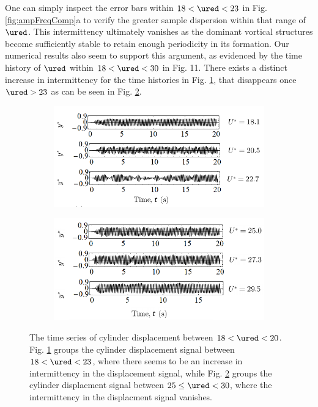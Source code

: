 \documentclass[a4paper,fleqn]{cas-sc}
\begin{document}
One can simply inspect the error bars within  $18 < \ured < 23$ in Fig. \ref{fig:ampFreqComp}a to verify the greater sample dispersion within that range of  $\ured$. This intermittency ultimately vanishes as the dominant vortical structures become sufficiently stable to retain enough periodicity in its formation. Our numerical results also seem to support this argument, as evidenced by the time history of  $\ured$ within $18 < \ured <30$ in Fig. 11. There exists a distinct increase in intermittency for the time histories in Fig. \ref{fig:unstableSVIV}, that disappears once  $\ured > 23$ as can be seen in Fig. \ref{fig:stableSVIV}.

\begin{figure}
  \centering
  \begin{subfigure}[h]{0.49\textwidth}
    \includegraphics[width=\textwidth]{figs/figure11a}
    \caption{}
    \label{fig:unstableSVIV}
  \end{subfigure}

  \begin{subfigure}[h]{0.49\textwidth}
    \includegraphics[width=\textwidth]{figs/figure11b}
    \caption{}
    \label{fig:stableSVIV}
  \end{subfigure}

  \caption{The time series of cylinder displacement between $18 < \ured < 20$. Fig. \ref{fig:unstableSVIV} groups the cylinder displacement signal between $18 < \ured < 23$, where there seems to be an increase in intermittency in the displacement signal, while Fig. \ref{fig:stableSVIV} groups the cylinder displacment signal between $25 \leq \ured < 30$, where the intermittency in the displacment signal vanishes.} \label{fig:cylDispSignal}
\end{figure}
\end{document}
